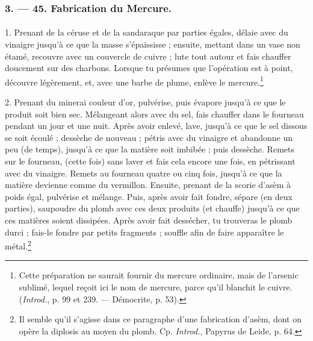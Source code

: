 \documentclass[landscape, a4paper, 11pt, oneside, polutonikogreek, french]{article}
\begin{document}
\bigskip
\centerline{\EightStarTaper}
\centerline{\EightStarTaper\EightStarTaper}
\bigskip

\subsubsection{3. --- 45. Fabrication du Mercure.}
\paragraph{}
1. Prenant de la céruse et de la sandaraque par parties égales, délaie avec du vinaigre jusqu'à ce que la masse s'épaississe ; ensuite, mettant dans un vase non étamé, recouvre avec un couvercle de cuivre ; lute tout autour et fais chauffer doucement sur des charbons. Lorsque tu présumes que l'opération est à point, découvre légèrement, et, avec une barbe de plume, enlève le mercure.\footnote{Cette préparation ne saurait fournir du mercure ordinaire, mais de l'arsenic sublimé, lequel reçoit ici le nom de mercure, parce qu'il blanchit le cuivre. (\emph{Introd.}, p. 99 et 239. --- Démocrite, p. 53).}

2. Prenant du minerai couleur d'or, pulvérise, puis évapore jusqu'à ce que le produit soit bien sec. Mélangeant alors avec du sel, fais chauffer dans le fourneau pendant un jour et une nuit. Après avoir enlevé, lave, jusqu'à ce que le sel dissous se soit écoulé ; dessèche de nouveau ; pétris avec du vinaigre et abandonne un peu (de temps), jusqu'à ce que la matière soit imbibée ; puis dessèche. Remets sur le fourneau, (cette fois) sans laver et fais cela encore une fois, en pétrissant avec du vinaigre. Remets au fourneau quatre ou cinq fois, jusqu'à ce que la matière devienne comme du vermillon. Ensuite, prenant de la scorie d'asèm à poids égal, pulvérise et mélange. Puis, après avoir fait fondre, sépare (en deux parties), saupoudre du plomb avec ces deux produits (et chauffe) jusqu'à ce que ces matières soient dissipées. Après avoir fait dessécher, tu trouveras le plomb durci ; fais-le fondre par petits fragments ; souffle afin de faire apparaître le métal.\footnote{Il semble qu'il s'agisse dans ce paragraphe d'une fabrication d'asèm, dont on opère la diplosis au moyen du plomb. Cp. \emph{Introd.}, Papyrus de Leide, p. 64.}
\end{document}
